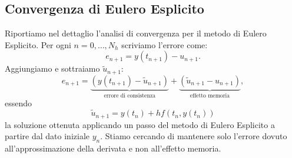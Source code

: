 \subsection{Convergenza di Eulero Esplicito}
Riportiamo nel dettaglio l’analisi di convergenza per il metodo di Eulero Esplicito. Per ogni $n=0,\dotsc ,N_{h}$ scriviamo l'errore come:
\begin{equation*}
e_{n+1} =y( t_{n+1}) -u_{n+1}.
\end{equation*}
Aggiungiamo e sottraiamo $\tilde{u}_{n+1}$:
\begin{equation*}
e_{n+1} =\underbrace{\left( y( t_{n+1}) -\tilde{u}_{n+1}\right)}_{\text{errore di consistenza}} +\underbrace{\left(\tilde{u}_{n+1} -u_{n+1}\right)}_{\text{effetto memoria}},
\end{equation*}
essendo
\begin{equation}
\tilde{u}_{n+1} =y( t_{n}) +hf( t_{n} ,y( t_{n}))
\label{eq:convergenza-ee-primo-passo}
\end{equation}
la soluzione ottenuta applicando un passo del metodo di Eulero Esplicito a partire dal dato iniziale $y_{n}$. Stiamo cercando di mantenere solo l'errore dovuto all'approssimazione della derivata e non all'effetto memoria.

